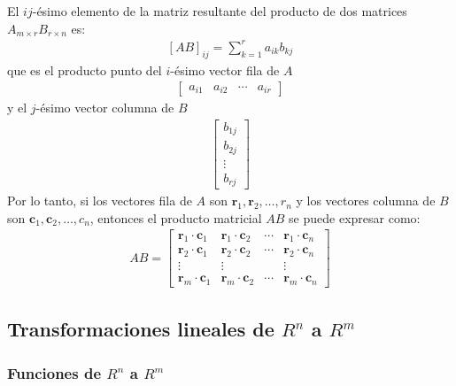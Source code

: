 \documentclass[a4paper,12pt]{article}
\begin{document}
El $ij$-ésimo elemento de la matriz resultante del producto de dos matrices
$A_{m\times r}B_{r\times n}$ es:
\begin{align*}
  \left[ AB \right]_{ij}=\sum_{k=1}^r a_{ik}b_{kj}
\end{align*}
que es el producto punto del $i$-ésimo vector fila de $A$
\begin{align*}
  \begin{bmatrix}
    a_{i1} & a_{i2} & \cdots & a_{ir}
  \end{bmatrix}
\end{align*}
y el $j$-ésimo vector columna de $B$
\begin{align*}
  \begin{bmatrix}
    b_{1j} \\
    b_{2j} \\
    \vdots \\
    b_{rj}
  \end{bmatrix}
\end{align*}
Por lo tanto, si los vectores fila de $A$ son $\mathbf{r}_1, \mathbf{r}_2,
\ldots, r_n$ y los vectores columna de $B$ son $\mathbf{c}_1, \mathbf{c}_2,
\ldots, c_n$, entonces el producto matricial $AB$ se puede expresar como:
\begin{align*}
  AB=
  \begin{bmatrix}
    \mathbf{r}_1\cdot\mathbf{c}_1 & \mathbf{r}_1\cdot\mathbf{c}_2 & \cdots &
    \mathbf{r}_1\cdot\mathbf{c}_n \\
    \mathbf{r}_2\cdot\mathbf{c}_1 & \mathbf{r}_2\cdot\mathbf{c}_2 & \cdots &
    \mathbf{r}_2\cdot\mathbf{c}_n \\
    \vdots  & \vdots  &    &  \vdots \\
    \mathbf{r}_m\cdot\mathbf{c}_1 & \mathbf{r}_m\cdot\mathbf{c}_2 & \cdots &
    \mathbf{r}_m\cdot\mathbf{c}_n
  \end{bmatrix}
\end{align*}

\subsection{Transformaciones lineales de $R^n$ a $R^m$}

\subsubsection{Funciones de $R^n$ a $R^m$}
\end{document}
